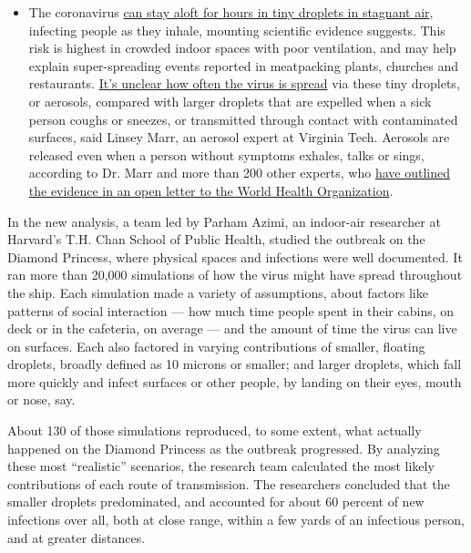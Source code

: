 \begin{itemize}
  \begin{itemize}
  \tightlist
  \item
    The coronavirus
    \href{https://www.nytimes.com/2020/07/04/health/239-experts-with-one-big-claim-the-coronavirus-is-airborne.html?action=click\&pgtype=Article\&state=default\&region=MAIN_CONTENT_3\&context=storylines_faq}{can
    stay aloft for hours in tiny droplets in stagnant air}, infecting
    people as they inhale, mounting scientific evidence suggests. This
    risk is highest in crowded indoor spaces with poor ventilation, and
    may help explain super-spreading events reported in meatpacking
    plants, churches and restaurants.
    \href{https://www.nytimes.com/2020/07/06/health/coronavirus-airborne-aerosols.html?action=click\&pgtype=Article\&state=default\&region=MAIN_CONTENT_3\&context=storylines_faq}{It's
    unclear how often the virus is spread} via these tiny droplets, or
    aerosols, compared with larger droplets that are expelled when a
    sick person coughs or sneezes, or transmitted through contact with
    contaminated surfaces, said Linsey Marr, an aerosol expert at
    Virginia Tech. Aerosols are released even when a person without
    symptoms exhales, talks or sings, according to Dr. Marr and more
    than 200 other experts, who
    \href{https://academic.oup.com/cid/article/doi/10.1093/cid/ciaa939/5867798}{have
    outlined the evidence in an open letter to the World Health
    Organization}.
  \end{itemize}
\end{itemize}

In the new analysis, a team led by Parham Azimi, an indoor-air
researcher at Harvard's T.H. Chan School of Public Health, studied the
outbreak on the Diamond Princess, where physical spaces and infections
were well documented. It ran more than 20,000 simulations of how the
virus might have spread throughout the ship. Each simulation made a
variety of assumptions, about factors like patterns of social
interaction --- how much time people spent in their cabins, on deck or
in the cafeteria, on average --- and the amount of time the virus can
live on surfaces. Each also factored in varying contributions of
smaller, floating droplets, broadly defined as 10 microns or smaller;
and larger droplets, which fall more quickly and infect surfaces or
other people, by landing on their eyes, mouth or nose, say.

About 130 of those simulations reproduced, to some extent, what actually
happened on the Diamond Princess as the outbreak progressed. By
analyzing these most ``realistic'' scenarios, the research team
calculated the most likely contributions of each route of transmission.
The researchers concluded that the smaller droplets predominated, and
accounted for about 60 percent of new infections over all, both at close
range, within a few yards of an infectious person, and at greater
distances.

